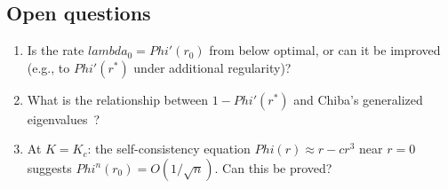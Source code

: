 \documentclass[11pt,a4paper]{article}
\let\Phi\relax\def\Phi{Phi}%
\let\lambda\relax\def\lambda{lambda}%
\theoremstyle{definition}
\begin{document}
\subsection{Open questions}

\begin{enumerate}[nosep]
\item Is the rate $\lambda_0 = \Phi'(r_0)$ from below optimal, or can it be improved (e.g., to $\Phi'(r^*)$ under additional regularity)?
\item What is the relationship between $1 - \Phi'(r^*)$ and Chiba's generalized eigenvalues~\cite{chiba2015}?
\item At $K = K_c$: the self-consistency equation $\Phi(r) \approx r - cr^3$ near $r = 0$ suggests $\Phi^n(r_0) = O(1/\sqrt{n})$. Can this be proved?
\end{enumerate}

\end{document}
